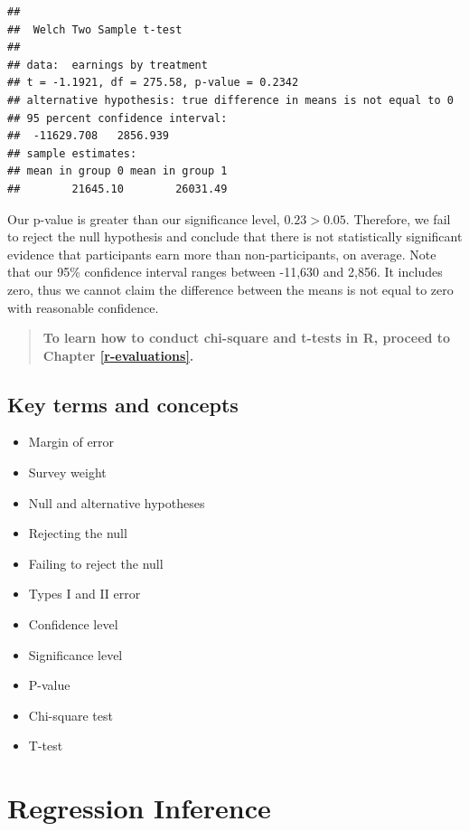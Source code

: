 \documentclass[
]{book}
\providecommand{\tightlist}{%
  \setlength{\itemsep}{0pt}\setlength{\parskip}{0pt}}
\newenvironment{learncheck}%
{%
  \par\vspace{\baselineskip}\noindent 
  \color{Exercise}\begin{itshape}%
  \par\vspace{\baselineskip}\noindent\ignorespaces 
}%
{%
  \end{itshape}\ignorespacesafterend 
}
\begin{document}
\begin{verbatim}
## 
## 	Welch Two Sample t-test
## 
## data:  earnings by treatment
## t = -1.1921, df = 275.58, p-value = 0.2342
## alternative hypothesis: true difference in means is not equal to 0
## 95 percent confidence interval:
##  -11629.708   2856.939
## sample estimates:
## mean in group 0 mean in group 1 
##        21645.10        26031.49
\end{verbatim}

Our p-value is greater than our significance level, \(0.23>0.05\). Therefore, we fail to reject the null hypothesis and conclude that there is not statistically significant evidence that participants earn more than non-participants, on average. Note that our 95\% confidence interval ranges between -11,630 and 2,856. It includes zero, thus we cannot claim the difference between the means is not equal to zero with reasonable confidence.

\begin{quote}
\textbf{To learn how to conduct chi-square and t-tests in R, proceed to Chapter \ref{r-evaluations}.}
\end{quote}

\hypertarget{kt11}{%
\section{Key terms and concepts}\label{kt11}}

\begin{learncheck}
\begin{itemize}
\tightlist
\item
  Margin of error
\item
  Survey weight
\item
  Null and alternative hypotheses
\item
  Rejecting the null
\item
  Failing to reject the null
\item
  Types I and II error
\item
  Confidence level
\item
  Significance level
\item
  P-value
\item
  Chi-square test
\item
  T-test
\end{itemize}
\end{learncheck}

\hypertarget{regression-inference}{%
\chapter{Regression Inference}\label{regression-inference}}
\end{document}
